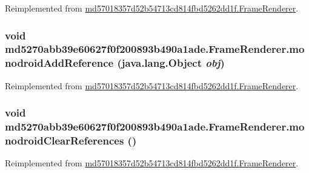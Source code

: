 Reimplemented from \hyperlink{classmd57018357d52b54713cd814fbd5262dd1f_1_1_frame_renderer_a810e33e4b7da21f778c64ab4be4d92d}{md57018357d52b54713cd814fbd5262dd1f.FrameRenderer}.\hypertarget{classmd5270abb39e60627f0f200893b490a1ade_1_1_frame_renderer_fab5536e45566fe5a5bb5bd22faef608}{
\subsubsection[{monodroidAddReference}]{\setlength{\rightskip}{0pt plus 5cm}void md5270abb39e60627f0f200893b490a1ade.FrameRenderer.monodroidAddReference (java.lang.Object {\em obj})}}
\label{classmd5270abb39e60627f0f200893b490a1ade_1_1_frame_renderer_fab5536e45566fe5a5bb5bd22faef608}




Reimplemented from \hyperlink{classmd57018357d52b54713cd814fbd5262dd1f_1_1_frame_renderer_14f0719110866c6f4a0475fbfc1ce2ad}{md57018357d52b54713cd814fbd5262dd1f.FrameRenderer}.\hypertarget{classmd5270abb39e60627f0f200893b490a1ade_1_1_frame_renderer_d655b8c79cca686e12df7655fe93f7f7}{
\subsubsection[{monodroidClearReferences}]{\setlength{\rightskip}{0pt plus 5cm}void md5270abb39e60627f0f200893b490a1ade.FrameRenderer.monodroidClearReferences ()}}
\label{classmd5270abb39e60627f0f200893b490a1ade_1_1_frame_renderer_d655b8c79cca686e12df7655fe93f7f7}




Reimplemented from \hyperlink{classmd57018357d52b54713cd814fbd5262dd1f_1_1_frame_renderer_7c48666937065ca752fc6c9435980aaa}{md57018357d52b54713cd814fbd5262dd1f.FrameRenderer}.


